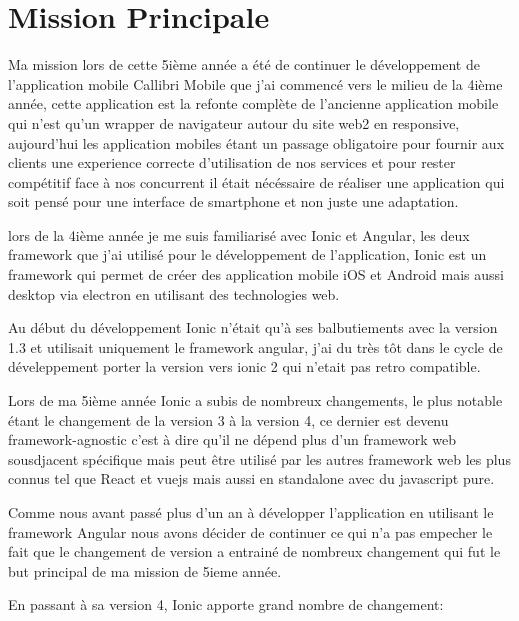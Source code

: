 \chapter{Mission Principale}
Ma mission lors de cette 5ième année a été de continuer le développement de l'application mobile Callibri Mobile
que j'ai commencé vers le milieu de la 4ième année, cette application est la refonte complète de l'ancienne 
application mobile qui n'est qu'un wrapper de navigateur autour du site web2 en responsive,
aujourd'hui les application mobiles étant un passage obligatoire pour fournir aux clients une experience 
correcte d'utilisation de nos services et pour rester compétitif face à nos concurrent 
il était nécéssaire de réaliser une application qui soit pensé pour une interface de smartphone et 
non juste une adaptation. \newline

lors de la 4ième année je me suis familiarisé avec Ionic et Angular, les deux framework que j'ai utilisé pour 
le développement de l'application, Ionic est un framework qui permet de créer des application mobile 
iOS et Android mais aussi desktop via electron en utilisant des technologies web.\newline

Au début du développement Ionic n'était qu'à ses balbutiements avec la version 1.3 et utilisait uniquement 
le framework angular, j'ai du très tôt dans le cycle de déveleppement porter la version vers ionic 2 qui n'etait pas retro 
compatible.\newline

Lors de ma 5ième année Ionic a subis de nombreux changements, le plus notable étant le changement de la version 3 
à la version 4, ce dernier est devenu framework-agnostic c'est à dire qu'il ne dépend plus d'un framework 
web sousdjacent spécifique mais peut être utilisé par les autres framework web les plus connus tel que 
React et vuejs mais aussi en standalone avec du javascript pure. \newline 

Comme nous avant passé plus d'un an à développer l'application en utilisant le framework Angular nous 
avons décider de continuer ce qui n'a pas empecher le fait que le changement de version 
a entrainé de nombreux changement qui fut le but principal de ma mission de 5ieme année. \newline

En passant à sa version 4, Ionic apporte grand nombre de changement:

